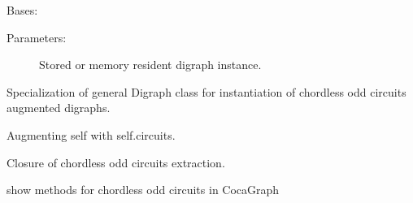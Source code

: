 \documentclass[letterpaper,10pt,english]{sphinxmanual}
\begin{document}

\begin{fulllineitems}
\label{techDoc:digraphs.CocaDigraph}
Bases: {\hyperref[techDoc:digraphs.Digraph]{}}
\begin{description}
\item[{Parameters:}] \leavevmode
Stored or memory resident digraph instance.

\end{description}

Specialization of general Digraph class for instantiation
of chordless odd circuits augmented digraphs.

\begin{fulllineitems}
\label{techDoc:digraphs.CocaDigraph.addCircuits}
Augmenting self with self.circuits.

\end{fulllineitems}


\begin{fulllineitems}
\label{techDoc:digraphs.CocaDigraph.closureChordlessOddCircuits}
Closure of chordless odd circuits extraction.

\end{fulllineitems}


\begin{fulllineitems}
\label{techDoc:digraphs.CocaDigraph.showCircuits}
show methods for chordless odd circuits in CocaGraph

\end{fulllineitems}


\begin{fulllineitems}
\label{techDoc:digraphs.CocaDigraph.showComponents}
\end{fulllineitems}


\end{fulllineitems}
\end{document}
